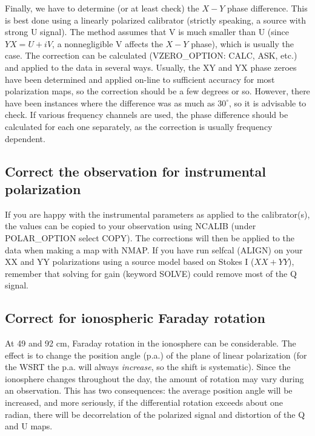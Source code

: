 Finally, we have to determine (or at least check) the $X-Y$ phase difference.
This is best done using a linearly polarized calibrator (strictly speaking, a
source with strong U signal). The method assumes that V is much smaller than U
(since $YX=U+iV$, a nonnegligible V affects the $X-Y$ phase), which is usually
the case. The correction can be calculated (VZERO\_OPTION: CALC, ASK, etc.) and
applied to the data in several ways. Usually, the XY and YX phase zeroes have
been determined and applied on-line to sufficient accuracy for most
polarization maps, so the correction should be a few degrees or so. However,
there have been instances where the difference was as much as $30^\circ$, so it
is advisable to check. If various frequency channels are used, the phase
difference should be calculated for each one separately, as the correction is
usually frequency dependent.

\subsection{Correct the observation for instrumental polarization}

If you are happy with the instrumental parameters as applied to the
calibrator(s), the values can be copied to your observation using NCALIB (under
POLAR\_OPTION select COPY). The corrections will then be applied to the data
when making a map with NMAP. If you have run selfcal (ALIGN) on your XX and YY
polarizations using a source model based on Stokes I ($XX+YY$), remember that
solving for gain (keyword SOLVE) could remove most of the Q signal.

\subsection{Correct for ionospheric Faraday rotation}

At 49 and 92 cm, Faraday rotation in the ionosphere can be considerable. The
effect is to change the position angle (p.a.) of the plane of linear
polarization (for the WSRT the p.a. will always {\it increase}, so the shift is
systematic). Since the ionosphere changes throughout the day, the amount of
rotation may vary during an observation. This has two consequences: the average
position angle will be increased, and more seriously, if the differential
rotation exceeds about one radian, there will be decorrelation of the polarized
signal and distortion of the Q and U maps.

